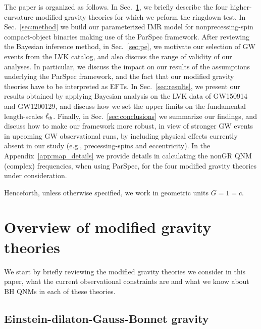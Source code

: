 \documentclass[twocolumn,
               prd,
               aps,
               superscriptaddress,
               tightenlines,
               nofootinbib,
               eqsecnum,
               amsfonts,
               amsmath,
               longbibliography]{revtex4-1}
\begin{document}
The paper is organized as follows. In Sec.~\ref{sec:review_theories}, we briefly describe the four 
higher-curvature modified gravity theories for which we peform the ringdown test. 
In Sec.~\ref{sec:method} we build our parameterized IMR model for nonprecessing-spin compact-object 
binaries making use of the ParSpec framework. After reviewing the Bayesian inference method, 
in Sec.~\ref{sec:pe}, we motivate our selection of GW events from the LVK catalog, and also 
discuss the range of validity of our analyses. In particular, we discuss the impact on 
our results of the assumptions underlying the ParSpec framework, and the fact that 
our modified gravity theories have to be interpreted as EFTs. In Sec.~\ref{sec:results}, 
we present our results obtained by applying Bayesian analysis on the LVK data of 
GW150914 and GW1200129, and discuss how we set the upper limits 
on the fundamental length-scales $\ell_{\rm th}$. Finally, in Sec.~\ref{sec:conclusions} we 
summarize our findings, and discuss how to make our framework more robust, in view 
of stronger GW events in upcoming GW observational runs, by including  physical effects currently absent in our 
study (e.g., precessing-spins and eccentricity). In the Appendix~\ref{app:map_details} 
we provide details in calculating the nonGR QNM (complex) frequencies, when using ParSpec,  
for the four modified gravity theories under consideration. 

Henceforth, unless otherwise specified, we work in geometric units $G = 1 = c$.

\section{Overview of modified gravity theories}
\label{sec:review_theories}

We start by briefly reviewing the modified gravity theories we consider in this
paper, what the current observational constraints are and what we know
about BH QNMs in each of these theories.

\subsection{Einstein-dilaton-Gauss-Bonnet gravity}
\label{sec:review_edgb}
\end{document}
